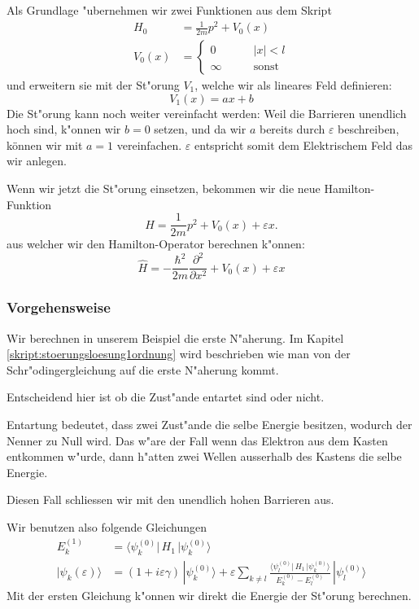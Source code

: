 \begin{refsection}
Als Grundlage "ubernehmen wir zwei Funktionen aus dem Skript
\begin{equation}
\begin{aligned}
H_0&=\frac1{2m}p^2+V_0(x)
\\
V_0(x)&=
  \begin{cases}
    0       & \qquad |x|<l\\
    \infty  & \qquad\text{sonst}
  \end{cases}
\end{aligned}
\end{equation}
und erweitern sie mit der St"orung $V_1$, welche wir als lineares Feld definieren:
\begin{equation}
  V_1(x) = a x + b
\end{equation}
Die St"orung kann noch weiter vereinfacht werden:
Weil die Barrieren unendlich hoch sind, k"onnen wir $b = 0$ setzen,
und da wir $a$ bereits durch $\varepsilon$ beschreiben, k\"onnen wir mit $a = 1$ vereinfachen.
$\varepsilon$ entspricht somit dem Elektrischem Feld das wir anlegen.


Wenn wir jetzt die St"orung einsetzen, bekommen wir die neue Hamilton-Funktion
\[
  H=\frac1{2m}p^2+V_0(x)
    + \varepsilon x.
\]
aus welcher wir den Hamilton-Operator berechnen k"onnen:
\[
  \hat{H} = -\frac{\hbar^2}{2m} \frac{\partial^2}{\partial x^2} + V_0(x) + \varepsilon x
\]

\subsubsection{Vorgehensweise}
Wir berechnen in unserem Beispiel die erste N"aherung.
Im Kapitel \ref{skript:stoerungsloesung1ordnung} wird beschrieben wie man von der Schr"odingergleichung 
auf die erste N"aherung kommt.

Entscheidend hier ist ob die Zust"ande entartet sind oder nicht.


Entartung bedeutet, dass zwei Zust"ande die selbe Energie besitzen, wodurch der Nenner zu Null wird.
Das w"are der Fall wenn das Elektron aus dem Kasten entkommen w"urde,
dann h"atten zwei Wellen ausserhalb des Kastens die selbe Energie.


Diesen Fall schliessen wir mit den unendlich hohen Barrieren aus.

Wir benutzen also folgende Gleichungen
\begin{equation}
\begin{aligned}
E_k^{(1)} &=
\langle \psi_k^{(0)}|\, H_1 \,|\psi_k^{(0)}\rangle
\\
|\psi_k(\varepsilon)\rangle &=
(1+i\varepsilon \gamma)
\,|\psi_k^{(0)}\rangle
+
\varepsilon
\sum_{k\ne l}
\frac{\langle \psi_l^{(0)}|\, H_1 \,|\psi_k^{(0)}\rangle}{E_k^{(0)}-E_l^{(0)}}
\,
|\psi_l^{(0)}\rangle
\label{eq:efeld_ESkalarprodukt}
\end{aligned}
\end{equation}
Mit der ersten Gleichung k"onnen wir direkt die Energie der St"orung berechnen.


\end{refsection}
